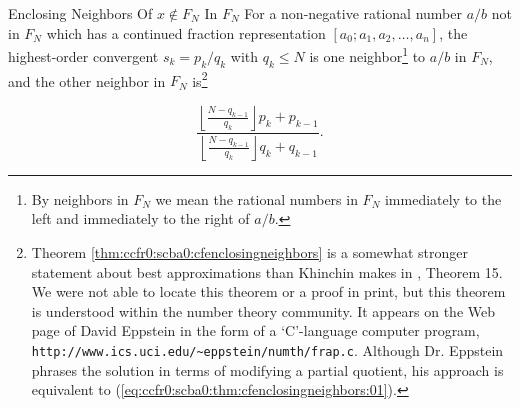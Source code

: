 \begin{vworktheoremstatementpar}{Enclosing Neighbors Of \mbox{\boldmath $x \notin F_N$} 
                                 In \mbox{\boldmath $F_N$}}
\label{thm:ccfr0:scba0:cfenclosingneighbors}
For a non-negative rational
number $a/b$ not in
$F_N$ which has a
continued fraction representation
$[a_0;a_1,a_2,\ldots{} ,a_n]$, the
highest-order convergent $s_k = p_k/q_k$ with $q_k \leq N$ is one
neighbor\footnote{By neighbors in $F_N$ we mean the rational numbers
in $F_N$ immediately to the left and immediately to the right
of $a/b$.}
to $a/b$ in $F_N$, and the other neighbor in
$F_N$ is\footnote{Theorem \ref{thm:ccfr0:scba0:cfenclosingneighbors}
is a somewhat stronger statement about best approximations
than Khinchin makes in \cite{bibref:b:KhinchinClassic}, Theorem 15.
We were not able to locate
this theorem or a proof in print,
but this theorem is understood within the number theory community.
It appears on the Web
page of David Eppstein \cite{bibref:i:davideppstein} in the form of a
`C'-language computer program,
\texttt{http://www.ics.uci.edu/\~{}{}eppstein/numth/frap.c}.
Although
Dr. Eppstein phrases the solution in terms of modifying
a partial quotient, his approach is equivalent to
(\ref{eq:ccfr0:scba0:thm:cfenclosingneighbors:01}).}

\begin{equation}
\label{eq:ccfr0:scba0:thm:cfenclosingneighbors:01}
\frac{{\displaystyle{\left\lfloor {\frac{{N - q_{k - 1} }}{{q_k }}} \right\rfloor}
 p_k  + p_{k - 1} }}{{\displaystyle{\left\lfloor {\frac{{N - q_{k - 1} }}{{q_k }}}
 \right\rfloor} q_k  + q_{k - 1} }}.
\end{equation}
\end{vworktheoremstatementpar}
